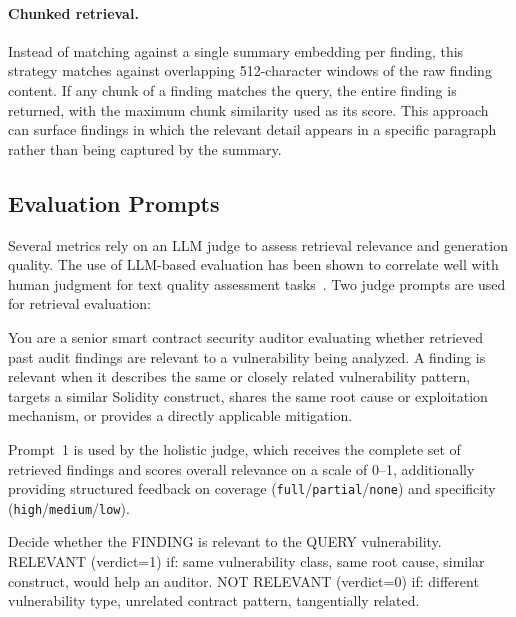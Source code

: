 \paragraph{Chunked retrieval.} Instead of matching against a single summary embedding per finding, this strategy matches against overlapping 512-character windows of the raw finding content. If any chunk of a finding matches the query, the entire finding is returned, with the maximum chunk similarity used as its score. This approach can surface findings in which the relevant detail appears in a specific paragraph rather than being captured by the summary.

\subsection{Evaluation Prompts}
\label{subsec:eval-prompts}

Several metrics rely on an LLM judge to assess retrieval relevance and generation quality. The use of LLM-based evaluation has been shown to correlate well with human judgment for text quality assessment tasks~\cite{zheng2023judging}. Two judge prompts are used for retrieval evaluation:

\begin{tcolorbox}[colback=gray!5, colframe=black!60, fonttitle=\bfseries, title=Prompt 1: Context Relevance]
You are a senior smart contract security auditor evaluating whether retrieved past audit findings are relevant to a vulnerability being analyzed. A finding is relevant when it describes the same or closely related vulnerability pattern, targets a similar Solidity construct, shares the same root cause or exploitation mechanism, or provides a directly applicable mitigation.
\end{tcolorbox}

Prompt~1 is used by the holistic judge, which receives the complete set of retrieved findings and scores overall relevance on a scale of 0--1, additionally providing structured feedback on coverage (\texttt{full}/\texttt{partial}/\texttt{none}) and specificity (\texttt{high}/\texttt{medium}/\texttt{low}).

\begin{tcolorbox}[colback=gray!5, colframe=black!60, fonttitle=\bfseries, title=Prompt 2: Context Precision]
Decide whether the FINDING is relevant to the QUERY vulnerability. RELEVANT (verdict=1) if: same vulnerability class, same root cause, similar construct, would help an auditor. NOT RELEVANT (verdict=0) if: different vulnerability type, unrelated contract pattern, tangentially related.
\end{tcolorbox}

